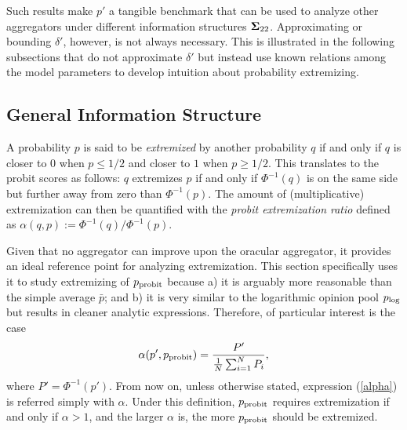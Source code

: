 \documentclass[12pt]{article}
\theoremstyle{definition}
\theoremstyle{definition}
\def\probit{p_{\rm probit}}
\def\plog{p_{\rm log}}
\begin{document}
Such results make $p'$ a tangible benchmark that can be used to analyze other aggregators under different information structures ${\bf\Sigma}_{22}$. Approximating or bounding $\delta'$, however, is not always necessary. This is illustrated in the following subsections that do not approximate $\delta'$ but instead use known relations among the model parameters to develop intuition about probability extremizing. 

\subsection{General Information Structure}

A probability $p$ is said to be \textit{extremized} by another probability $q$ if and only
if $q$ is closer to $0$ when $p \leq 1/2$ and closer to $1$ when $p
\geq 1/2$. This translates to the probit scores as follows: $q$ extremizes $p$ if and only if  $\Phi^{-1}(q)$ is on the same side but further away from zero than $\Phi^{-1}(p)$. The amount of (multiplicative) extremization can then be quantified with the {\em probit extremization ratio} defined as 
 $\alpha(q,p) := \Phi^{-1}(q) / \Phi^{-1} (p)$. 
 
 
 Given that no aggregator can improve upon the oracular aggregator, it provides an ideal
reference point for analyzing extremization. This section specifically uses it to study
extremizing of $\probit$ because a) it is arguably more
reasonable than the simple average $\bar{p}$; and b) it is very
similar to the logarithmic opinion pool $\plog$ but results in cleaner
analytic expressions. Therefore, of particular interest is the case
\begin{align}
\alpha(p', \probit)  = \frac{P'}{\frac{1}{N}\sum_{i=1}^N P_{i}}, \label{alpha}
\end{align}
where $P' = \Phi^{-1}(p')$. From now on, unless otherwise stated, expression (\ref{alpha}) is referred simply with
$\alpha$. 
Under this definition, $\probit$
requires extremization if and only if $\alpha > 1$, and the larger $\alpha$ is, the more $\probit$ should be extremized. 
\end{document}
